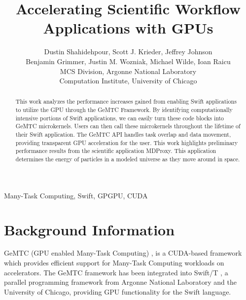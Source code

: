 \documentclass[conference]{IEEEtran}
\begin{document}
%
\title{Accelerating Scientific Workflow Applications with GPUs}


\author{Dustin Shahidehpour,
Scott J. Krieder,
Jeffrey Johnson\\
Benjamin Grimmer,
Justin M. Wozniak,
Michael Wilde,
Ioan Raicu\\
MCS Division, Argonne National Laboratory\\
Computation Institute, University of Chicago
}


\maketitle


\begin{abstract}
This work analyzes the performance increases gained from enabling Swift applications to utilize the GPU through the GeMTC Framework. By identifying computationally intensive portions of Swift applications, we can easily turn these code blocks into GeMTC microkernels. Users can then call these microkernels throughout the lifetime of their Swift application. The GeMTC API handles task overlap and data movement, providing transparent GPU acceleration for the user. This work highlights preliminary performance results from the scientific application MDProxy. This application determines the energy of particles in a modeled universe as they move around in space.
\end{abstract}

\begin{IEEEkeywords}
Many-Task Computing, Swift, GPGPU, CUDA
\end{IEEEkeywords}

\IEEEpeerreviewmaketitle

\section{Background Information}
GeMTC (GPU enabled Many-Task Computing) \cite{kriederSC12}, is a CUDA-based framework which provides efficient support for Many-Task Computing \cite{raicu2008toward} workloads on accelerators. \cite{kriederGCASR12} The GeMTC framework has been integrated into Swift/T \cite{wozniak13swift}, a parallel programming framework from Argonne National Laboratory and the University of Chicago, providing GPU functionality for the Swift language. \cite{zhao2007swift}
\end{document}
